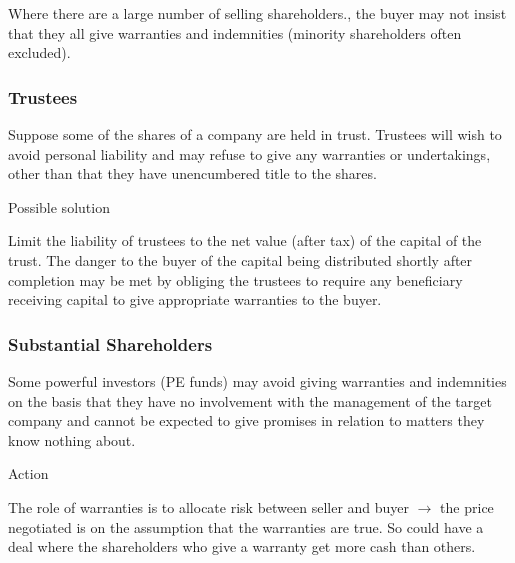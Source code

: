 \documentclass[
]{article}
\newenvironment{env-a57f3fff-c46d-4aeb-b36c-ada0d8066098}
{
    \savenotes\tcolorbox[blanker,breakable,left=5pt,borderline west={2pt}{-4pt}{aquamarine}]
}
{
    \endtcolorbox\spewnotes
}
\begin{document}
Where there are a large number of selling shareholders., the buyer may
not insist that they all give warranties and indemnities (minority
shareholders often excluded).

\hypertarget{trustees}{%
\subsubsection{Trustees}\label{trustees}}

Suppose some of the shares of a company are held in trust. Trustees will
wish to avoid personal liability and may refuse to give any warranties
or undertakings, other than that they have unencumbered title to the
shares.

\begin{env-a57f3fff-c46d-4aeb-b36c-ada0d8066098}

Possible solution

Limit the liability of trustees to the net value (after tax) of the
capital of the trust. The danger to the buyer of the capital being
distributed shortly after completion may be met by obliging the trustees
to require any beneficiary receiving capital to give appropriate
warranties to the buyer.

\end{env-a57f3fff-c46d-4aeb-b36c-ada0d8066098}

\hypertarget{substantial-shareholders}{%
\subsubsection{Substantial
Shareholders}\label{substantial-shareholders}}

Some powerful investors (PE funds) may avoid giving warranties and
indemnities on the basis that they have no involvement with the
management of the target company and cannot be expected to give promises
in relation to matters they know nothing about.

\begin{env-a57f3fff-c46d-4aeb-b36c-ada0d8066098}

Action

The role of warranties is to allocate risk between seller and buyer
{\(\rightarrow\)} the price negotiated is on the assumption that the
warranties are true. So could have a deal where the shareholders who
give a warranty get more cash than others.

\end{env-a57f3fff-c46d-4aeb-b36c-ada0d8066098}
\end{document}
